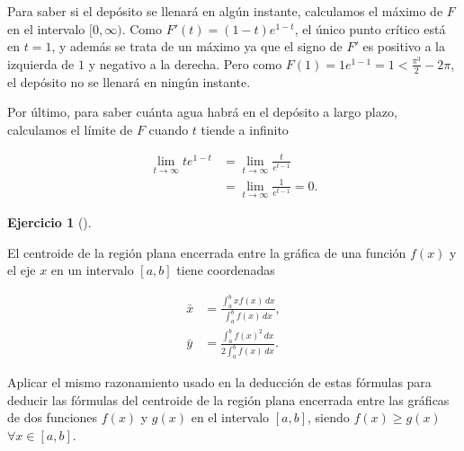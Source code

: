 \documentclass[
  spanish,
  a4paper,
]{scrreport}
\theoremstyle{definition}
\newtheorem{exercise}{Ejercicio}[chapter]
\theoremstyle{remark}
\begin{document}
\begin{tcolorbox}
Para saber si el depósito se llenará en algún instante, calculamos el
máximo de \(F\) en el intervalo \([0, \infty)\). Como
\(F'(t) = (1-t)e^{1-t}\), el único punto crítico está en \(t=1\), y
además se trata de un máximo ya que el signo de \(F'\) es positivo a la
izquierda de \(1\) y negativo a la derecha. Pero como
\(F(1) = 1e^{1-1} = 1 < \frac{\pi^3}{2} - 2\pi\), el depósito no se
llenará en ningún instante.

Por último, para saber cuánta agua habrá en el depósito a largo plazo,
calculamos el límite de \(F\) cuando \(t\) tiende a infinito

\begin{align*}
\lim_{t \to \infty} te^{1-t} 
&= \lim_{t \to \infty} \frac{t}{e^{t-1}} \tag{L'Hôpital} \\
&= \lim_{t \to \infty} \frac{1}{e^{t-1}} 
= 0.
\end{align*}

\end{tcolorbox}

\begin{exercise}[]\protect\hypertarget{exr-4}{}\label{exr-4}

El centroide de la región plana encerrada entre la gráfica de una
función \(f(x)\) y el eje \(x\) en un intervalo \([a,b]\) tiene
coordenadas

\begin{align*}
\bar x &= \frac{\int_a^b x f(x)\,dx}{\int_a^b f(x)\,dx},\\
\bar y &= \frac{\int_a^b f(x)^2\, dx}{2\int_a^b f(x)\,dx}.
\end{align*}

Aplicar el mismo razonamiento usado en la deducción de estas fórmulas
para deducir las fórmulas del centroide de la región plana encerrada
entre las gráficas de dos funciones \(f(x)\) y \(g(x)\) en el intervalo
\([a,b]\), siendo \(f(x)\geq g(x)\) \(\forall x\in[a,b]\).

\end{exercise}
\end{document}
